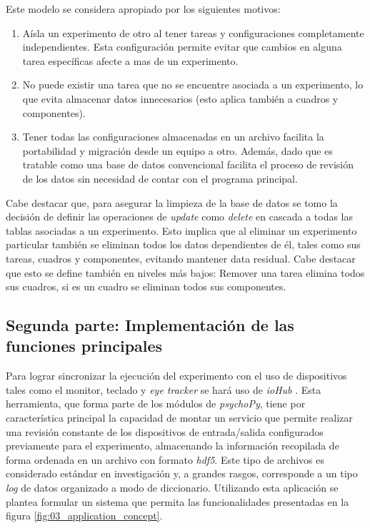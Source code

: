 \documentclass[\main/main.tex]{subfiles}
\begin{document}
			Este modelo se considera apropiado por los siguientes motivos:
			\begin{enumerate}\setlength\itemsep{-0.5em}
				\item Aísla un experimento de otro al tener tareas y configuraciones completamente independientes. Esta configuración permite evitar que cambios en alguna tarea específicas afecte a mas de un experimento.

				\item No puede existir una tarea que no se encuentre asociada a un experimento, lo que evita almacenar datos innecesarios (esto aplica también a cuadros y componentes). 

				\item Tener todas las configuraciones almacenadas en un archivo facilita la portabilidad y migración desde un equipo a otro. Además, dado que es tratable como una base de datos convencional facilita el proceso de revisión de los datos sin necesidad de contar con el programa principal.
			\end{enumerate}

			Cabe destacar que, para asegurar la limpieza de la base de datos se tomo la decisión de definir las operaciones de \textit{update} como \textit{delete} en cascada a todas las tablas asociadas a un experimento. Esto implica que al eliminar un experimento particular también se eliminan todos los datos dependientes de él, tales como sus tareas, cuadros y componentes, evitando mantener data residual. Cabe destacar que esto se define también en niveles más bajos: Remover una tarea elimina todos sus cuadros, si es un cuadro se eliminan todos sus componentes.  

		\subsection{Segunda parte: Implementación de las funciones principales}
		\label{sub:03_implementacion_backtend}
			Para lograr sincronizar la ejecución del experimento con el uso de dispositivos tales como el monitor, teclado y \textit{eye tracker} se hará uso de \textit{ioHub} \cite{website:iohub}. Esta herramienta, que forma parte de los módulos de \textit{psychoPy}, tiene por característica principal la capacidad de montar un servicio que permite realizar una revisión constante de los dispositivos de entrada/salida configurados previamente para el experimento, almacenando la información recopilada de forma ordenada en un archivo con formato \textit{hdf5}. Este tipo de archivos es considerado estándar en investigación y, a grandes rasgos, corresponde a un tipo \textit{\gls{log}} de datos organizado a modo de diccionario. Utilizando esta aplicación se plantea formular un sistema que permita las funcionalidades presentadas en la figura \ref{fig:03_application_concept}. 
\end{document}
